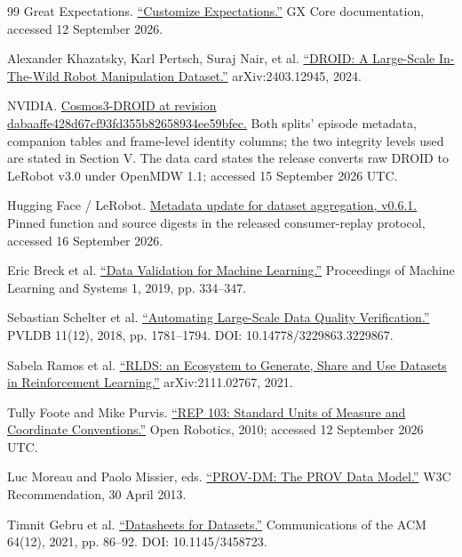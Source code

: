 \documentclass[conference]{IEEEtran}
\begin{document}
\begin{thebibliography}{99}
 Great Expectations. \href{https://docs.greatexpectations.io/docs/core/customize_expectations/}{“Customize Expectations.”} GX Core documentation, accessed 12 September 2026.

 Alexander Khazatsky, Karl Pertsch, Suraj Nair, et al. \href{https://arxiv.org/abs/2403.12945}{“DROID: A Large-Scale In-The-Wild Robot Manipulation Dataset.”} arXiv:2403.12945, 2024.

 NVIDIA. \href{https://huggingface.co/datasets/nvidia/Cosmos3-DROID/tree/dabaaffe428d67cf93fd355b82658934ee59bfec}{Cosmos3-DROID at revision dabaaffe428d\allowbreak{}67cf93fd355b\allowbreak{}82658934ee59\allowbreak{}bfec.} Both splits' episode metadata, companion tables and frame-level identity columns; the two integrity levels used are stated in Section V. The data card states the release converts raw DROID to LeRobot v3.0 under OpenMDW 1.1; accessed 15 September 2026 UTC.

 Hugging Face / LeRobot. \href{https://github.com/huggingface/lerobot/blob/7e241bd630a3719a56157a497ce5d08f244784f1/src/lerobot/datasets/aggregate.py\#L184-L347}{Metadata update for dataset aggregation, v0.6.1.} Pinned function and source digests in the released consumer-replay protocol, accessed 16 September 2026.

 Eric Breck et al. \href{https://proceedings.mlsys.org/paper_files/paper/2019/file/928f1160e52192e3e0017fb63ab65391-Paper.pdf}{“Data Validation for Machine Learning.”} Proceedings of Machine Learning and Systems 1, 2019, pp. 334--347.

 Sebastian Schelter et al. \href{https://www.vldb.org/pvldb/vol11/p1781-schelter.pdf}{“Automating Large-Scale Data Quality Verification.”} PVLDB 11(12), 2018, pp. 1781--1794. DOI: 10.14778/3229863.3229867.

 Sabela Ramos et al. \href{https://arxiv.org/abs/2111.02767}{“RLDS: an Ecosystem to Generate, Share and Use Datasets in Reinforcement Learning.”} arXiv:2111.02767, 2021.

 Tully Foote and Mike Purvis. \href{https://reps.openrobotics.org/rep-0103/}{“REP 103: Standard Units of Measure and Coordinate Conventions.”} Open Robotics, 2010; accessed 12 September 2026 UTC.

 Luc Moreau and Paolo Missier, eds. \href{https://www.w3.org/TR/2013/REC-prov-dm-20130430/}{“PROV-DM: The PROV Data Model.”} W3C Recommendation, 30 April 2013.

 Timnit Gebru et al. \href{https://arxiv.org/abs/1803.09010}{“Datasheets for Datasets.”} Communications of the ACM 64(12), 2021, pp. 86--92. DOI: 10.1145/3458723.


\end{thebibliography}
\end{document}
